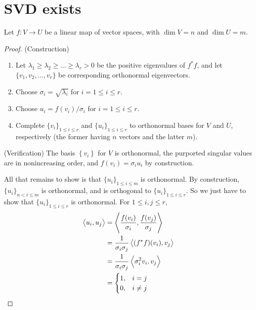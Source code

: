 \section{SVD exists}
\begin{theorem}
  Let \(f: V \to U\) be a linear map of vector spaces, with \(\dim V = n\) and \(\dim U = m\).
\end{theorem}
\begin{proof}
  (Construction)
  \begin{enumerate}
    \item Let \(\lambda_1 \geq \lambda_2 \geq \ldots \geq \lambda_r > 0\) be the positive eigenvalues of \(f^*f\), and let \(\{v_1, v_2, \ldots, v_r\}\) be corresponding orthonormal eigenvectors.
    \item Choose \(\sigma_i = \sqrt{\lambda_i}\) for \(i = 1 \leq i \leq r\).
    \item Choose \(u_i = f(v_i)/\sigma_i\) for \(i = 1 \leq i \leq  r\).
    \item Complete \(\{v_i\}_{1 \leq i \leq r}\) and \(\{u_i\}_{1 \leq i \leq r}\)
    to orthonormal bases for \(V\) and \(U\), respectively (the former having \(n\) vectors and the latter \(m\)).
  \end{enumerate}

  (Verification)
  The basis \(\left\{v_i\right\}\) for \(V\) is orthonormal,
  the purported singular values are in nonincreasing order,
  and \(f(v_i) = \sigma_i u_i\) by construction.

  All that remains to show is that
  \(\{u_i\}_{1 \leq i \leq m}\) is orthonormal.
  By construction,
  \(\{u_i\}_{n < i \leq m}\) is orthonormal, and is orthogonal to
  \(\{u_i\}_{1 \leq i \leq r}\).
  So we just have to show that
  \(\{u_i\}_{1 \leq i \leq r}\)
  is orthonormal. For \(1 \leq i, j \leq r\),
  \begin{align}
    \left\langle u_i, u_j\right\rangle
    &=
    \left\langle
      \frac{f(v_i)}{\sigma_i}
    , 
      \frac{f(v_j)}{\sigma_j}
    \right\rangle\\
    &=
    \frac{1}{\sigma_i\sigma_j}
    \left\langle
      (f^*f)(v_i)
    , 
      v_j
    \right\rangle\\
    &=
    \frac{1}{\sigma_i\sigma_j}
    \left\langle
      \sigma_i^2 v_i
    , 
      v_j
    \right\rangle\\
    &=
    \begin{cases}
      1, & i = j\\
      0, & i \neq j
    \end{cases}
  \end{align}
\end{proof}

